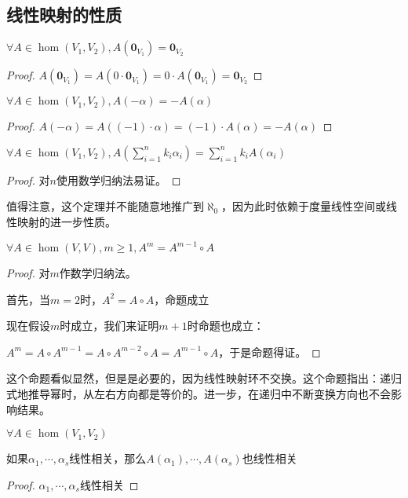 \documentclass[12pt, a4paper, oneside, UTF8]{ctexbook}
\begin{document}
		\subsection{线性映射的性质}
			\begin{para}{0}
				\point{}
					\begin{proposition}
						$\forall A \in \hom(V_1,V_2),A(\mathbf{0}_{V_1}) = \mathbf{0}_{V_2}$
					\end{proposition}
					\begin{proof}
						$A(\mathbf{0}_{V_1})=A(0\cdot \mathbf{0}_{V_1})=0\cdot A(\mathbf{0}_{V_1})=\mathbf{0}_{V_2}$
					\end{proof}
				\point{}
					\begin{proposition}
						$\forall A \in \hom(V_1,V_2),A(-\alpha )=-A(\alpha )$
					\end{proposition}
					\begin{proof}
						$A(-\alpha )=A((-1)\cdot \alpha )=(-1)\cdot A(\alpha )=-A(\alpha )$
					\end{proof}
				\point{}
					\begin{proposition}
						$\forall A \in \hom(V_1,V_2),A(\sum\limits_{i=1}^{n} k_i \alpha_i)=\sum\limits_{i=1}^{n} k_i A(\alpha_i)$
					\end{proposition}
					\begin{proof}
						对$n$使用数学归纳法易证。
					\end{proof}
					值得注意，这个定理并不能随意地推广到$\aleph_0$，因为此时依赖于度量线性空间或线性映射的进一步性质。
				\point{}
					\begin{proposition}
						$\forall A \in \hom(V,V),m \geqslant 1, A^m = A^{m-1} \circ A$
					\end{proposition}
					\begin{proof}
						对$m$作数学归纳法。

						首先，当$m=2$时，$A^2 = A \circ A$，命题成立

						现在假设$m$时成立，我们来证明$m+1$时命题也成立：

						$A^m = A \circ A^{m-1} = A \circ A^{m-2} \circ A = A^{m-1} \circ A$，于是命题得证。
					\end{proof}
					这个命题看似显然，但是是必要的，因为线性映射环不交换。这个命题指出：递归式地推导幂时，从左右方向都是等价的。进一步，在递归中不断变换方向也不会影响结果。
				\point{}
					\begin{proposition}
						$\forall A \in \hom(V_1,V_2)$

						如果$\alpha_1,\cdots,\alpha_s$线性相关，那么$A(\alpha_1),\cdots,A(\alpha_s)$也线性相关
					\end{proposition}
					\begin{proof}
						$\alpha_1,\cdots,\alpha_s$线性相关


\end{proof}
\end{para}
\end{document}
